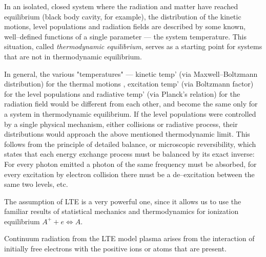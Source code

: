 \documentclass[../main.tex]{subfiles}
\begin{document}
In an isolated, closed system where the radiation and matter have reached equilibrium (black body cavity, for example), the distribution of the kinetic motions, level populations and radiation fields are described by some known, well--defined functions of a single parameter --- the system temperature. This situation, called \textit{thermodynamic equilibrium}, serves as a starting point for systems that are not in thermodynamic equilibrium.

In general, the various "temperatures" --- kinetic temp' (via Maxwell--Boltzmann distribution) for the thermal motions , excitation temp' (via Boltzmann factor) for the level populations and radiative temp' (via Planck's relation) for the radiation field would be different from each other, and become the same only for a system in thermodynamic equilibrium. If the level populations were controlled by a single physical mechanism, either collisions or radiative process, their distributions would approach the above mentioned thermodynamic limit. This follows from the principle of detailed balance, or microscopic reversibility, which states that each energy exchange process must be balanced by its exact inverse: For every photon emitted a photon of the same frequency must be absorbed, for every excitation by electron collision there must be a  de--excitation between the same two levels, etc.


The assumption of LTE is a very powerful one, since it allows us to use the familiar results of statistical mechanics and thermodynamics  for ionization equilibrium $A^{+} +e\Leftrightarrow A$.

Continuum radiation from the LTE model plasma arises from the interaction of initially free electrons with the positive ions or atoms that are present.
\end{document}

